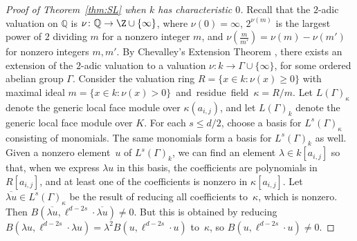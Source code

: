 \begin{proof}[Proof of Theorem~\ref{thm:SL} when $k$ has characteristic $0$]
Recall that the $2$-adic valuation on $\mathbb{Q}$ is $\nu \colon \mathbb{Q} \to \Z \cup \{ \infty \}$, where $\nu(0) = \infty$, $2^{\nu(m)}$ is the largest power of $2$ dividing $m$ for a nonzero integer $m$, and $\nu(\frac{m}{m'}) = \nu(m) - \nu(m')$ for nonzero integers $m,m'$. By Chevalley's Extension Theorem \cite[Theorem~3.1.2]{EPValuedFields}, there exists an extension of the  $2$-adic valuation to a valuation $\nu \colon k \to  \Gamma \cup \{ \infty \}$, for some ordered abelian group $\Gamma$. Consider the valuation ring $R = \{ x \in k : \nu(x) \ge 0 \}$ with maximal ideal \mbox{$m = \{ x \in k : \nu(x) > 0 \}$ and  residue field $\kappa = R/m$}. 
Let $L(\Gamma)_{\kappa}$ denote the generic local face module over $\kappa(a_{i,j})$, and let $L(\Gamma)_k$ denote the generic local face module over $K$. For each $s \le d/2$, choose a basis for $L^s(\Gamma)_{\kappa}$ consisting of monomials. The same monomials form a basis for $L^s(\Gamma)_k$ as well. Given a nonzero element~$u$ of $L^s(\Gamma)_k$, we can find an element $\lambda \in k[a_{i,j}]$ so that, when we express $\lambda u$ in this basis, the coefficients are polynomials in $R[a_{i,j}]$, and at least one of the coefficients is nonzero in $\kappa[a_{i,j}]$.
Let $\overline{\lambda u} \in L^s(\Gamma)_{\kappa}$ be the result of reducing all coefficients to~$\kappa$, which is nonzero. Then $B(\overline{\lambda u}, \ell^{d - 2s} \cdot \overline{\lambda u}) \not=0$. But this is obtained by reducing $B(\lambda u, \ell^{d - 2s} \cdot \lambda u) = \lambda^2 B(u, \ell^{d - 2s} \cdot u)$ to~$\kappa$, so $B(u, \ell^{d - 2s} \cdot u) \not= 0$. 
\end{proof}

